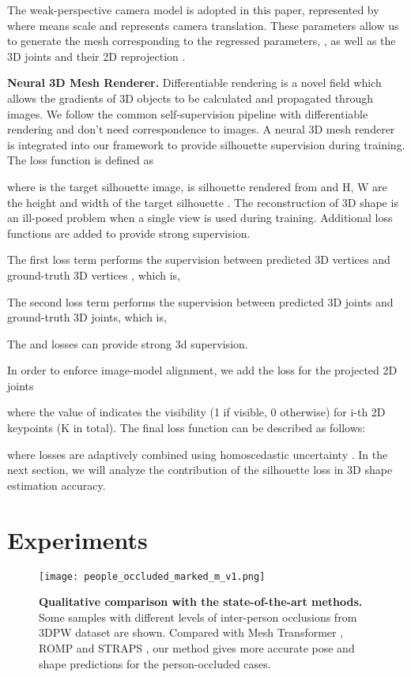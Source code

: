 \documentclass[journal]{IEEEtran}
\begin{document}
The weak-perspective camera model is adopted in this paper, represented by  where  means scale and  represents  camera translation. These parameters allow us to generate the mesh corresponding to the regressed parameters, , as well as the 3D joints  and their 2D reprojection .


\noindent\textbf{Neural 3D Mesh Renderer.} Differentiable rendering is a novel field which allows the gradients of 3D objects to be calculated and propagated through images. We follow the common self-supervision pipeline with differentiable rendering and don't need correspondence to images. A neural 3D mesh renderer  \cite{kato2018neural} is integrated into our framework to provide silhouette supervision during training. The loss function is defined as 

where  is the target silhouette image,  is silhouette rendered from  and H, W are the height and width of the target silhouette . The reconstruction of 3D shape is an ill-posed problem when a single view is used during training. Additional loss functions are added to provide strong supervision.


The first loss term  performs the supervision between predicted 3D vertices  and ground-truth 3D vertices , which is,


The second loss term  performs the supervision between predicted 3D joints and ground-truth 3D joints, which is,

The  and  losses can provide strong 3d supervision.


In order to enforce image-model alignment, we add the loss for the projected 2D joints

where the value of  indicates the visibility (1 if visible, 0 otherwise) for i-th 2D keypoints (K in total).
The final loss function can be described as follows:

where losses are adaptively combined using homoscedastic uncertainty \cite{kendall2018multi}.
In the next section, we will analyze the contribution of the silhouette loss  in 3D shape estimation accuracy.

\section{Experiments}
\begin{figure*}[htbp]
    
    \centerline{\texttt{[image: people\_occluded\_marked\_m\_v1.png]}}
\caption{\textbf{Qualitative comparison with the state-of-the-art methods.} Some samples with different levels of inter-person occlusions from 3DPW dataset are shown. Compared with Mesh Transformer \cite{lin2021end-to-end}, ROMP \cite{ROMP} and STRAPS \cite{STRAPS2020BMVC}, our method gives more accurate pose and shape predictions for the person-occluded cases.}
    \label{fig:people-occluded}
\end{figure*}
\end{document}
